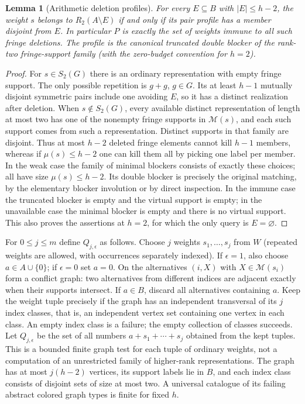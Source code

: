 \documentclass[11pt]{article}
\newtheorem{lemma}[theorem]{Lemma}
\theoremstyle{remark}\newtheorem{remark}[theorem]{Remark}
\begin{document}
\begin{lemma}[Arithmetic deletion profiles]\label{lem:pairdeletion}
For every $E\subseteq B$ with $|E|\le h-2$, the weight $s$ belongs to $R_2(A\setminus E)$ if and only if its pair profile has a member disjoint from $E$. In particular $P$ is exactly the set of weights immune to all such fringe deletions. The profile is the canonical truncated double blocker of the rank-two fringe-support family (with the zero-budget convention for $h=2$).
\end{lemma}
\begin{proof}
For $s\in S_2(G)$ there is an ordinary representation with empty fringe support. The only possible repetition is $g+g$, $g\in G$. Its at least $h-1$ mutually disjoint symmetric pairs include one avoiding $E$, so it has a distinct realization after deletion. When $s\notin S_2(G)$, every available distinct representation of length at most two has one of the nonempty fringe supports in $\mathcal M(s)$, and each such support comes from such a representation. Distinct supports in that family are disjoint. Thus at most $h-2$ deleted fringe elements cannot kill $h-1$ members, whereas if $\mu(s)\le h-2$ one can kill them all by picking one label per member. In the weak case the family of minimal blockers consists of exactly these choices; all have size $\mu(s)\le h-2$. Its double blocker is precisely the original matching, by the elementary blocker involution or by direct inspection. In the immune case the truncated blocker is empty and the virtual support is empty; in the unavailable case the minimal blocker is empty and there is no virtual support. This also proves the assertions at $h=2$, for which the only query is $E=\varnothing$.
\end{proof}

For $0\le j\le m$ define $Q_{j,\epsilon}$ as follows. Choose $j$ weights $s_1,\ldots,s_j$ from $W$ (repeated weights are allowed, with occurrences separately indexed). If $\epsilon=1$, also choose $a\in A\cup\{0\}$; if $\epsilon=0$ set $a=0$. On the alternatives $(i,X)$ with $X\in\mathcal M(s_i)$ form a conflict graph: two alternatives from different indices are adjacent exactly when their supports intersect. If $a\in B$, discard all alternatives containing $a$. Keep the weight tuple precisely if the graph has an independent transversal of its $j$ index classes, that is, an independent vertex set containing one vertex in each class. An empty index class is a failure; the empty collection of classes succeeds. Let $Q_{j,\epsilon}$ be the set of all numbers $a+s_1+\cdots+s_j$ obtained from the kept tuples. This is a bounded finite graph test for each tuple of ordinary weights, not a computation of an unrestricted family of higher-rank representations. The graph has at most $j(h-2)$ vertices, its support labels lie in $B$, and each index class consists of disjoint sets of size at most two. A universal catalogue of its failing abstract colored graph types is finite for fixed $h$.
\end{document}
